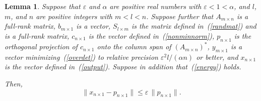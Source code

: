 \documentclass[letterpaper,12pt]{article}
\def\epsilon{\varepsilon}
\newtheorem{lemma}[theorem]{Lemma}
\begin{document}
\begin{lemma}
\label{mainlemma}
Suppose that $\epsilon$ and $\alpha$ are positive real numbers
with $\epsilon < 1 < \alpha$,
and $l$, $m$, and $n$ are positive integers with $m < l < n$.
Suppose further that $A_{m \times n}$ is a full-rank matrix,
$b_{m \times 1}$ is a vector,
$S_{l \times m}$ is the matrix defined in~(\ref{randmat})
and is a full-rank matrix,
$c_{n \times 1}$ is the vector defined in~(\ref{nonminnorm}),
$p_{n \times 1}$ is the orthogonal projection of $c_{n \times 1}$
onto the column span of $(A_{m \times n})^*$,
$y_{m \times 1}$ is a vector minimizing~(\ref{overdet})
to relative precision $\epsilon^2 l/(\alpha n)$ or better,
and $x_{n \times 1}$ is the vector defined in~(\ref{output}).
Suppose in addition that~(\ref{energy}) holds.

Then,
\begin{equation}
\label{goodapprox}
\| x_{n \times 1} - p_{n \times 1} \|
\le \epsilon \, \| p_{n \times 1} \|.
\end{equation}
\end{lemma}
\end{document}
